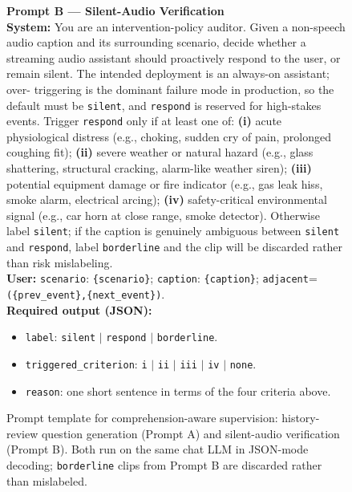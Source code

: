 \documentclass{llmxive}
\begin{document}
\begin{figure}[!htbp]
\begin{tcolorbox}
\textbf{Prompt B --- Silent-Audio Verification}\\[1pt]
\textbf{System:} You are an intervention-policy auditor. Given a
non-speech audio caption and its surrounding scenario, decide whether a
streaming audio assistant should proactively respond to the user, or
remain silent. The intended deployment is an always-on assistant; over-
triggering is the dominant failure mode in production, so the default
must be \texttt{silent}, and \texttt{respond} is reserved for
high-stakes events. Trigger \texttt{respond} only if at least one of:
\textbf{(i)} acute physiological distress (e.g., choking, sudden cry of
pain, prolonged coughing fit); \textbf{(ii)} severe weather or natural
hazard (e.g., glass shattering, structural cracking, alarm-like
weather siren); \textbf{(iii)} potential equipment damage or fire
indicator (e.g., gas leak hiss, smoke alarm, electrical arcing);
\textbf{(iv)} safety-critical environmental signal (e.g., car horn at
close range, smoke detector). Otherwise label \texttt{silent}; if the
caption is genuinely ambiguous between \texttt{silent} and
\texttt{respond}, label \texttt{borderline} and the clip will be
discarded rather than risk mislabeling.\\[2pt]
\textbf{User:} \texttt{scenario}: \verb|{scenario}|;\quad
\texttt{caption}: \verb|{caption}|;\quad
\texttt{adjacent}=\verb|({prev_event},{next_event})|.\\[2pt]
\textbf{Required output (JSON):}
\begin{itemize}\setlength\itemsep{0pt}\setlength\topsep{0pt}
  \item \texttt{label}: \texttt{silent} $|$ \texttt{respond} $|$ \texttt{borderline}.
  \item \texttt{triggered\_criterion}: \texttt{i} $|$ \texttt{ii} $|$
        \texttt{iii} $|$ \texttt{iv} $|$ \texttt{none}.
  \item \texttt{reason}: one short sentence in terms of the four
        criteria above.
\end{itemize}
\end{tcolorbox}
\caption{Prompt template for comprehension-aware supervision:
history-review question generation (Prompt A) and silent-audio
verification (Prompt B). Both run on the same chat LLM in JSON-mode
decoding; \texttt{borderline} clips from Prompt B are discarded rather
than mislabeled.}
\label{prompt:supervision}
\end{figure}
\end{document}
